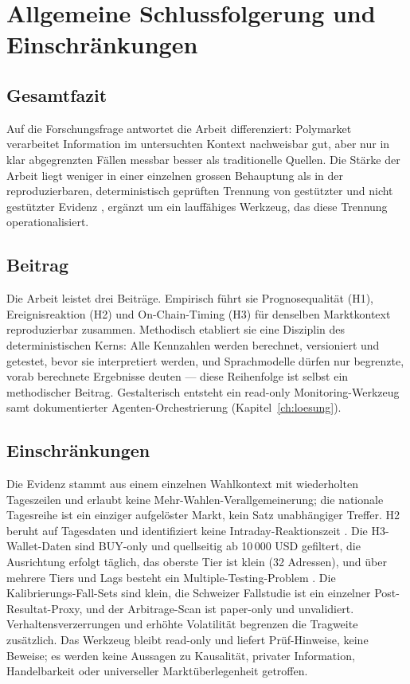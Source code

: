 \chapter{Allgemeine Schlussfolgerung und Einschränkungen}
\label{ch:einschraenkungen}

\section{Gesamtfazit}
Auf die Forschungsfrage antwortet die Arbeit differenziert: Polymarket verarbeitet
Information im untersuchten Kontext nachweisbar gut, aber nur in klar abgegrenzten
Fällen messbar besser als traditionelle Quellen. Die Stärke der Arbeit liegt
weniger in einer einzelnen grossen Behauptung als in der reproduzierbaren,
deterministisch geprüften Trennung von gestützter und nicht gestützter Evidenz
\citep{lit_emh_001}, ergänzt um ein lauffähiges Werkzeug, das diese Trennung
operationalisiert.

\section{Beitrag}
Die Arbeit leistet drei Beiträge. Empirisch führt sie Prognosequalität (H1),
Ereignisreaktion (H2) und On-Chain-Timing (H3) für denselben Marktkontext
reproduzierbar zusammen. Methodisch etabliert sie eine Disziplin des
deterministischen Kerns: Alle Kennzahlen werden berechnet, versioniert und
getestet, bevor sie interpretiert werden, und Sprachmodelle dürfen nur begrenzte,
vorab berechnete Ergebnisse deuten --- diese Reihenfolge ist selbst ein
methodischer Beitrag. Gestalterisch entsteht ein read-only Monitoring-Werkzeug
samt dokumentierter Agenten-Orchestrierung (Kapitel~\ref{ch:loesung}).

\section{Einschränkungen}
Die Evidenz stammt aus einem einzelnen Wahlkontext mit wiederholten Tageszeilen und
erlaubt keine Mehr-Wahlen-Verallgemeinerung; die nationale Tagesreihe ist ein
einziger aufgelöster Markt, kein Satz unabhängiger Treffer. H2 beruht auf
Tagesdaten und identifiziert keine Intraday-Reaktionszeit \citep{lit_eventstudy_001}.
Die H3-Wallet-Daten sind BUY-only und quellseitig ab 10\,000 USD gefiltert, die
Ausrichtung erfolgt täglich, das oberste Tier ist klein (32 Adressen), und über
mehrere Tiers und Lags besteht ein Multiple-Testing-Problem \citep{lit_granger_001}.
Die Kalibrierungs-Fall-Sets sind klein, die Schweizer Fallstudie ist ein einzelner
Post-Resultat-Proxy, und der Arbitrage-Scan ist paper-only und unvalidiert.
Verhaltensverzerrungen und erhöhte Volatilität \citep{zotero_poly_007} begrenzen die
Tragweite zusätzlich. Das Werkzeug bleibt read-only und liefert Prüf-Hinweise, keine
Beweise; es werden keine Aussagen zu Kausalität, privater Information, Handelbarkeit
oder universeller Marktüberlegenheit getroffen.

